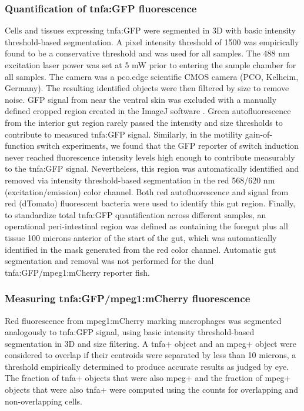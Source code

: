 {{{{{{{\subsubsection{Quantification of tnfa:GFP fluorescence}
Cells and tissues expressing tnfa:GFP were segmented in 3D with basic intensity threshold-based segmentation. A pixel intensity threshold of 1500 was empirically found to be a conservative threshold and was used for all samples. The 488 nm excitation laser power was set at 5 mW prior to entering the sample chamber for all samples. The camera was a pco.edge scientific CMOS camera (PCO, Kelheim, Germany). The resulting identified objects were then filtered by size to remove noise. GFP signal from near the ventral skin was excluded with a manually defined cropped region created in the ImageJ software \cite{schindelin_fiji_2012}. Green autofluorescence from the interior gut region rarely passed the intensity and size thresholds to contribute to measured tnfa:GFP signal. Similarly, in the motility gain-of-function switch experiments, we found that the GFP reporter of switch induction never reached fluorescence intensity levels high enough to contribute measurably to the tnfa:GFP signal. Nevertheless, this region was automatically identified and removed via intensity threshold-based segmentation in the red 568/620 nm (excitation/emission) color channel. Both red autofluorescence and signal from red (dTomato) fluorescent bacteria were used to identify this gut region. Finally, to standardize total tnfa:GFP quantification across different samples, an operational peri-intestinal region was defined as containing the foregut plus all tissue 100 microns anterior of the start of the gut, which was automatically identified in the mask generated from the red color channel. Automatic gut segmentation and removal was not performed for the dual tnfa:GFP/mpeg1:mCherry reporter fish.

\subsubsection{Measuring tnfa:GFP/mpeg1:mCherry fluorescence}
Red fluorescence from mpeg1:mCherry marking macrophages was segmented analogously to tnfa:GFP signal, using basic intensity threshold-based segmentation in 3D and size filtering. A tnfa+ object and an mpeg+ object were considered to overlap if their centroids were separated by less than 10 microns, a threshold empirically determined to produce accurate results as judged by eye. The fraction of tnfa+ objects that were also mpeg+ and the fraction of mpeg+ objects that were also tnfa+ were computed using the counts for overlapping and non-overlapping cells.

}}}}}}}
